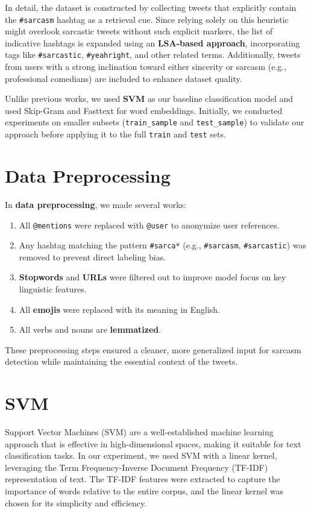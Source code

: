 \documentclass[11pt]{article}
\begin{document}
In detail, the dataset is constructed by collecting tweets that explicitly contain the \texttt{\#sarcasm} hashtag as a retrieval cue. Since relying solely on this heuristic might overlook sarcastic tweets without such explicit markers, the list of indicative hashtags is expanded using an \textbf{LSA-based approach}, incorporating tags like \texttt{\#sarcastic}, \texttt{\#yeahright}, and other related terms. Additionally, tweets from users with a strong inclination toward either sincerity or sarcasm (e.g., professional comedians) are included to enhance dataset quality.

Unlike previous works, we used \textbf{SVM} as our baseline classification model and used Skip-Gram and Fasttext for word embeddings. Initially, we conducted experiments on smaller subsets (\texttt{train\_sample} and \texttt{test\_sample}) to validate our approach before applying it to the full \texttt{train} and \texttt{test} sets.

\section{Data Preprocessing}
In \textbf{data preprocessing}, we made several works:
\begin{enumerate}
    \item All \texttt{@mentions} were replaced with \texttt{@user} to anonymize user references.
    \item Any hashtag matching the pattern \texttt{\#sarca*} (e.g., \texttt{\#sarcasm}, \texttt{\#sarcastic}) was removed to prevent direct labeling bias.
    \item \textbf{Stopwords} and \textbf{URLs} were filtered out to improve model focus on key linguistic features.
    \item All \textbf{emojis} were replaced with its meaning in English.
    \item All verbs and nouns are \textbf{lemmatized}.
\end{enumerate}

These preprocessing steps ensured a cleaner, more generalized input for sarcasm detection while maintaining the essential context of the tweets.

\section{SVM}
Support Vector Machines (SVM) are a well-established machine learning approach that is effective in high-dimensional spaces, making it suitable for text classification tasks. In our experiment, we used SVM with a linear kernel, leveraging the Term Frequency-Inverse Document Frequency (TF-IDF) representation of text. The TF-IDF features were extracted to capture the importance of words relative to the entire corpus, and the linear kernel was chosen for its simplicity and efficiency.
\end{document}
